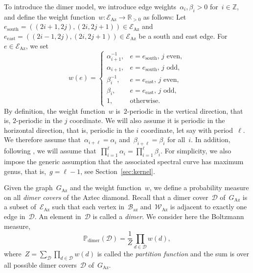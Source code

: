 \documentclass[11pt]{article}
\theoremstyle{plain}
\theoremstyle{definition}
\numberwithin{equation}{section}
\newcommand{\ZZ}{\mathbb{Z}}
\newcommand{\RR}{\mathbb{R}}
\newcommand{\PP}{\mathbb{P}}
\begin{document}
To introduce the dimer model, we introduce edge weights~$\alpha_i,\beta_i>0$ for~$i\in \ZZ$, and define the weight function~$w:\mathcal E_\text{Az}\to \RR_{>0}$ as follows: Let~$e_\text{south}=((2i+1,2j),(2i,2j+1))\in \mathcal E_\text{Az}$ and~$e_\text{east}=((2i-1,2j),(2i,2j+1))\in \mathcal E_\text{Az}$ be a south and east edge. For~$e\in \mathcal E_\text{Az}$, we set
\begin{equation}\label{eqn:edge_weights}
w(e)=
\begin{cases}
\alpha_{i+1}^{-1}, & e=e_\text{south}, \, j \text{ even}, \\
\alpha_{i+1}, & e=e_\text{south}, \, j \text{ odd}, \\
\beta_i^{-1}, & e=e_\text{east}, \, j \text{ even}, \\
\beta_i, & e=e_\text{east}, \, j \text{ odd}, \\
1, & \text{otherwise}.
\end{cases}
\end{equation}
By definition, the weight function~$w$ is~$2$-periodic in the vertical direction, that is, $2$-periodic in the $j$ coordinate. We will also assume it is periodic in the horizontal direction, that is, periodic in the $i$ coordinate, let say with period~$\ell$. We therefore assume that~$\alpha_{i+\ell}=\alpha_i$ and~$\beta_{i+\ell}=\beta_i$ for all~$i$. In addition, following \cite{Ber21}, we will assume that~$\prod_{i=1}^\ell \alpha_i=\prod_{i=1}^\ell \beta_i$. For simplicity, we also impose the generic assumption that the associated spectral curve has maximum genus, that is,~$g=\ell-1$, see Section~\ref{sec:kernel}.

Given the graph~$G_\text{Az}$ and the weight function~$w$, we define a probability measure on all \emph{dimer covers} of the Aztec diamond. Recall that a dimer cover~$\mathcal D$ of~$G_\text{Az}$ is a subset of~$\mathcal E_\text{Az}$ such that each vertex in~$\mathcal B_\text{az}$ and~$\mathcal W_\text{Az}$ is adjacent to exactly one edge in~$\mathcal D$. An element in~$\mathcal D$ is called a \emph{dimer}. We consider here the Boltzmann measure,
\begin{equation}\label{eq:dimer_measure}
\PP_{\operatorname{dimer}}(\mathcal D)=\frac{1}{Z}\prod_{d\in \mathcal D} w(d),
\end{equation}
where~$Z=\sum_{\mathcal D}\prod_{d\in \mathcal D} w(d)$ is called the \emph{partition function} and the sum is over all possible dimer covers~$\mathcal D$ of~$G_\text{Az}$.
\end{document}
